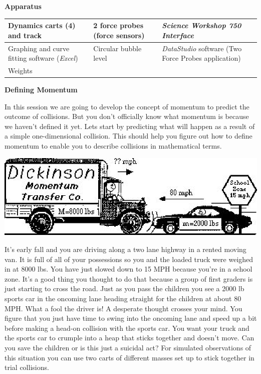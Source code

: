 \textbf{Apparatus} 

\begin{center}
\begin{tabular}{|p{1.5in}|p{1.5in}|p{1.75in}|} \hline
Dynamics carts (4) and track                         & 2 force probes (force sensors) & \textit{Science Workshop 750 Interface} \\ \hline
Graphing and curve fitting software (\textit{Excel}) & Circular bubble level          & \textit{DataStudio} software (Two Force Probes application) \\ \hline
Weights                                              &                                &                                            \\ \hline
\end{tabular}
\end{center}


\textbf{Defining Momentum }

In this session we are going to develop the concept of momentum to predict the
outcome of collisions. But you don't officially know what momentum is because
we haven't defined it yet. Lets start by predicting what will happen as a result
of a simple one-dimensional collision. This should help you figure out how to
define momentum to enable you to describe collisions in mathematical terms.

\vspace{0.3cm}
{\par\centering \includegraphics{momentum/momentum_fig1.eps} \par}
\vspace{0.3cm}

It's early fall and you are driving along a two lane highway in a rented moving
van. It is full of all of your possessions so you and the loaded truck were
weighed in at 8000 lbs. You have just slowed down to 15 MPH because you're in
a school zone. It's a good thing you thought to do that because a group of first
graders is just starting to cross the road. Just as you pass the children you
see a 2000 lb sports car in the oncoming lane heading straight for the children
at about 80 MPH. What a fool the driver is! A desperate thought crosses your
mind. You figure that you just have time to swing into the oncoming lane and
speed up a bit before making a head-on collision with the sports car. You want
your truck and the sports car to crumple into a heap that sticks together and
doesn't move. Can you save the children or is this just a suicidal act? For
simulated observations of this situation you can use two carts of different
masses set up to stick together in trial collisions. 

